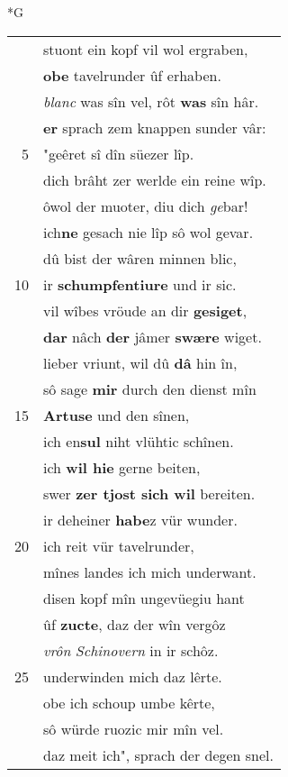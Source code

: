 \documentclass[8pt,a4paper,notitlepage]{article}
\begin{document}
\begin{table}[ht]
\begin{minipage}[t]{0.5\linewidth}
\small
\begin{center}*G
\end{center}
\begin{tabular}{rl}
 & stuont ein kopf vil wol ergraben,\\ 
 & \textbf{obe} tavelrunder ûf erhaben.\\ 
 & \textit{blanc} was sîn vel, rôt \textbf{was} sîn hâr.\\ 
 & \textbf{er} sprach zem knappen sunder vâr:\\ 
5 & "geêret sî dîn süezer lîp.\\ 
 & dich brâht zer werlde ein reine wîp.\\ 
 & ôwol der muoter, diu dich \textit{ge}bar!\\ 
 & ich\textbf{ne} gesach nie lîp sô wol gevar.\\ 
 & dû bist der wâren minnen blic,\\ 
10 & ir \textbf{schumpfentiure} und ir sic.\\ 
 & vil wîbes vröude an dir \textbf{gesiget},\\ 
 & \textbf{dar} nâch \textbf{der} jâmer \textbf{swære} wiget.\\ 
 & lieber vriunt, wil dû \textbf{dâ} hin în,\\ 
 & sô sage \textbf{mir} durch den dienst mîn\\ 
15 & \textbf{Artuse} und den sînen,\\ 
 & ich en\textbf{sul} niht vlühtic schînen.\\ 
 & ich \textbf{wil hie} gerne beiten,\\ 
 & swer \textbf{zer tjost sich wil} bereiten.\\ 
 & ir deheiner \textbf{habe}z vür wunder.\\ 
20 & ich reit vür tavelrunder,\\ 
 & mînes landes ich mich underwant.\\ 
 & disen kopf mîn ungevüegiu hant\\ 
 & ûf \textbf{zucte}, daz der wîn vergôz\\ 
 & \textit{vrôn} \textit{Schinovern} in ir schôz.\\ 
25 & underwinden mich daz lêrte.\\ 
 & obe ich schoup umbe kêrte,\\ 
 & sô würde ruozic mir mîn vel.\\ 
 & daz meit ich", sprach der degen snel.\\ 

\end{tabular}
\end{minipage}
\end{table}
\end{document}
